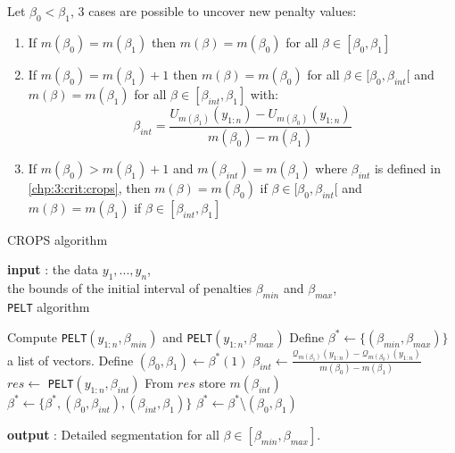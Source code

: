 \begin{theorem}
Let $\beta_0 < \beta_1$, 3 cases are possible to uncover new penalty values:
\begin{enumerate}
  \item If $m(\beta_0) = m(\beta_1)$ then $m(\beta) = m(\beta_0)$ for all $\beta \in [\beta_0,\beta_1]$
  \item If $m(\beta_0) = m(\beta_1)+1$ then $m(\beta) = m(\beta_0)$ for all $\beta\in[\beta_0,\beta_{int}[$ and $m(\beta) = m(\beta_1)$ for all $\beta\in[\beta_{int},\beta_1]$ with:
  \begin{equation}\label{chp:3:crit:crops}
    \beta_{int} = \frac{U_{m(\beta_1)}(y_{1:n})-U_{m(\beta_0)}(y_{1:n})}{m(\beta_0)-m(\beta_1)}
  \end{equation}
  \item If $m(\beta_0) > m(\beta_1)+1$ and $m(\beta_{int}) = m(\beta_1)$ where $\beta_{int}$ is defined in \ref{chp:3:crit:crops}, then $m(\beta) = m(\beta_0)$ if $\beta\in[\beta_0,\beta_{int}[$ and $m(\beta) = m(\beta_1)$ if $\beta\in [\beta_{int},\beta_1]$
\end{enumerate}
\end{theorem} 

\begin{algorithm}[ht]
\caption{CROPS algorithm}\label{chp:3:algocrops}
\begin{algorithmic}

\State \textbf{input} : the data $y_{1},...,y_{n}$, \\
the bounds of the initial interval of penalties $\beta_{min}$ and $\beta_{max}$, \\
\texttt{PELT} algorithm 
  
\State Compute \texttt{PELT}$(y_{1:n},\beta_{min})$ and \texttt{PELT}$(y_{1:n},\beta_{max})$ 
\State Define $\beta^* \gets \{(\beta_{min},\beta_{max})\}$ a list of vectors.  
\While{$\beta^*\neq \emptyset$}
  \State Define $(\beta_0, \beta_1) \gets \beta^*(1)$
    \State $\beta_{int} \gets \frac{\mathcal{Q}_{m(\beta_1)}(y_{1:n})-\mathcal{Q}_{m(\beta_0)}(y_{1:n})}{m(\beta_0)-m(\beta_1)}$
    \State $res \gets$ \texttt{PELT}$(y_{1:n},\beta_{int})$
    \State From $res$ store $m(\beta_{int})$
      \State $\beta^* \gets \{\beta^*,(\beta_0,\beta_{int}),(\beta_{int},\beta_1)\}$
    \EndIf
  \EndIf
  \State $\beta^* \gets \beta^*$\textbackslash$(\beta_0,\beta_1)$
\EndWhile 
   
\State \textbf{output} : Detailed segmentation for all $\beta \in [\beta_{min},\beta_{max}]$. 
\end{algorithmic}
\end{algorithm} 

